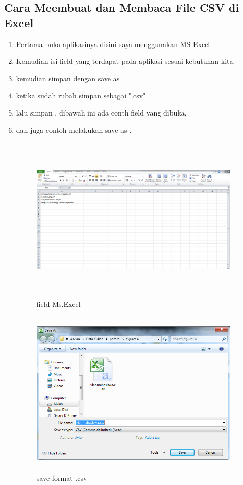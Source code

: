 \documentclass[a4paper,12pt]{report}
\begin{document}
\subsection{Cara Meembuat dan Membaca File CSV di Excel}
\begin{enumerate}
    \item Pertama buka aplikasinya disini saya menggunakan MS Excel
    \item Kemudian isi field yang terdapat pada aplikasi sesuai kebutuhan kita.
    \item kemudian simpan dengan save as 
    \item ketika sudah rubah simpan sebagai ".csv"
    \item lalu simpan , dibawah ini ada conth field yang dibuka, 
    \item dan juga contoh melakukan save as .
    \begin{figure}[!htbp]
\centering
\includegraphics[width=10cm,height=8cm]{figures/1.PNG}
\caption{field Ms.Excel}
\label{penanda}
\end{figure}
    \begin{figure}[!htbp]
\centering
\includegraphics[width=10cm,height=8cm]{figures/2.PNG}
\caption{save format .csv}
\label{penanda}
\end{figure}
    \end{enumerate}
\end{document}
